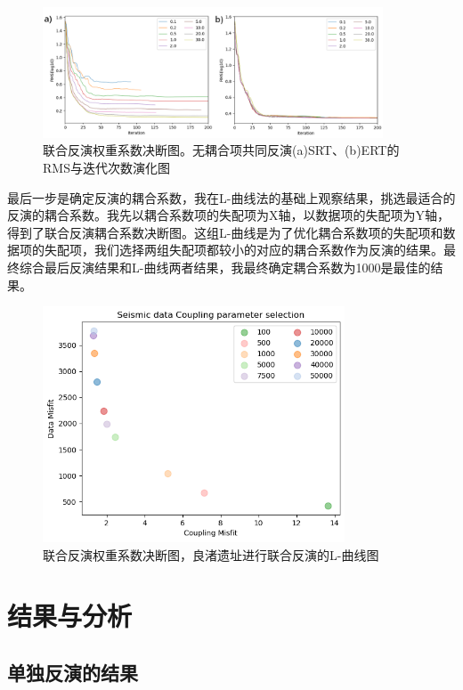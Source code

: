 \begin{figure}[ht]
    \centering
    \includegraphics[width=0.9\textwidth]{figure/thesis/rms_curve.png}
    \caption{联合反演权重系数决断图。无耦合项共同反演(a)SRT、(b)ERT的RMS与迭代次数演化图}
    \label{fig:rms_curve}
\end{figure}

最后一步是确定反演的耦合系数，我在L-曲线法的基础上观察结果，挑选最适合的反演的耦合系数。我先以耦合系数项的失配项为X轴，以数据项的失配项为Y轴，得到了联合反演耦合系数决断图。这组L-曲线是为了优化耦合系数项的失配项和数据项的失配项，我们选择两组失配项都较小的对应的耦合系数作为反演的结果。最终综合最后反演结果和L-曲线两者结果，我最终确定耦合系数为1000是最佳的结果。

\begin{figure}[ht]
    \centering
    \includegraphics[width=0.8\textwidth]{figure/thesis/coupling.png}
    \caption{联合反演权重系数决断图，良渚遗址进行联合反演的L-曲线图}
    \label{fig:coupling}
\end{figure}

\newpage
\section{结果与分析}
\subsection{单独反演的结果}


